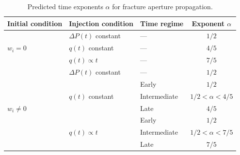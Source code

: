 \documentclass[12pt]{article}
\begin{document}
\begin{table}[htbp]
	\centering
	\caption{Predicted time exponents $\alpha$ for fracture aperture propagation.}
	\label{tab:exponents}
	\begin{tabular}{l l l c}
		\toprule
		\textbf{Initial condition} & \textbf{Injection condition}      & \textbf{Time regime} & \textbf{Exponent $\alpha$} \\
		\midrule
		\multirow{3}{*}{$w_i = 0$}
		                           & $\Delta P(t)$ constant            & —                    & $1/2$                      \\
		                           & $q(t)$ constant                   & —                    & $4/5$                      \\
		                           & $q(t) \propto t$                  & —                    & $7/5$                      \\
		\midrule
		\multirow{7}{*}{$w_i \neq 0$}
		                           & $\Delta P(t)$ constant            & —                    & $1/2$                      \\
		\cmidrule{2-4}
		                           & \multirow{3}{*}{$q(t)$ constant}
		                           & Early                             & $1/2$                                             \\
		                           &                                   & Intermediate         & $1/2 < \alpha < 4/5$       \\
		                           &                                   & Late                 & $4/5$                      \\
		\cmidrule{2-4}
		                           & \multirow{3}{*}{$q(t) \propto t$}
		                           & Early                             & $1/2$                                             \\
		                           &                                   & Intermediate         & $1/2 < \alpha < 7/5$       \\
		                           &                                   & Late                 & $7/5$                      \\
		\bottomrule
	\end{tabular}
\end{table}
\printbibliography
\end{document}
